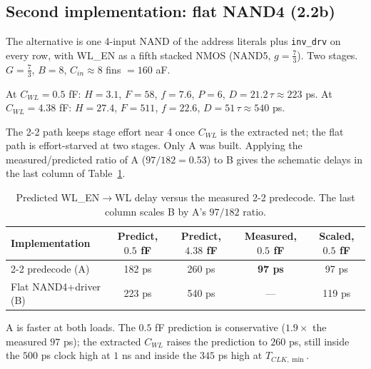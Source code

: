 \documentclass[10pt,letterpaper]{article}
\newcommand{\code}[1]{\texttt{#1}}
\begin{document}
\subsection{Second implementation: flat NAND4 (2.2b)}
The alternative is one 4-input NAND of the address literals plus \code{inv\_drv} on every row, with WL\_EN as a fifth stacked NMOS (NAND5, $g=\tfrac73$). Two stages. $G=\tfrac73$, $B=8$, $C_{in}\approx8$ fins $=160$ aF.

At $C_{WL}=0.5$ fF: $H=3.1$, $F=58$, $f=7.6$, $P=6$, $D=21.2\,\tau\approx223$ ps.
At $C_{WL}=4.38$ fF: $H=27.4$, $F=511$, $f=22.6$, $D=51\,\tau\approx540$ ps.

The 2-2 path keeps stage effort near 4 once $C_{WL}$ is the extracted net; the flat path is effort-starved at two stages. Only A was built. Applying the measured/predicted ratio of A ($97/182=0.53$) to B gives the schematic delays in the last column of Table~\ref{tab:le}.

\begin{table}[H]\centering
\caption{Predicted WL\_EN$\to$WL delay versus the measured 2-2 predecode. The last column scales B by A's $97/182$ ratio.}\label{tab:le}
\begin{tabular}{@{}lcccc@{}}\toprule Implementation & Predict, $0.5$ fF & Predict, $4.38$ fF & Measured, $0.5$ fF & Scaled, $0.5$ fF\\\midrule
2-2 predecode (A) & 182 ps & 260 ps & \textbf{97 ps} & 97 ps\\
Flat NAND4+driver (B) & 223 ps & 540 ps & --- & 119 ps\\\bottomrule\end{tabular}
\end{table}
A is faster at both loads. The $0.5$ fF prediction is conservative ($1.9\times$ the measured $97$ ps); the extracted $C_{WL}$ raises the prediction to $260$ ps, still inside the $500$ ps clock high at $1$ ns and inside the $345$ ps high at $T_{CLK,\min}$.
\end{document}
